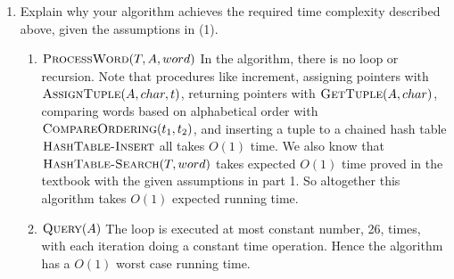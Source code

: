 \documentclass[11pt]{article}
\begin{document}
\begin{enumerate}
\begin{algorithm}[H]
  \end{algorithm}

  \begin{algorithm}[H]
    \caption{$ $}
  \end{algorithm}
  \item Explain why your algorithm achieves the required time complexity described above, given the assumptions in (1).

  \begin{enumerate}
    \item $\textsc{ProcessWord}(T, A, word)$ In the algorithm, there is no loop or recursion. Note that procedures like increment, assigning pointers with $\textsc{AssignTuple}(A, char, t)$, returning pointers with $\textsc{GetTuple}(A, char)$, comparing words based on alphabetical order with $\textsc{CompareOrdering}(t_1, t_2)$, and inserting a tuple to a chained hash table $\textsc{HashTable-Insert}$ all takes $O(1)$ time. We also know that $\textsc{HashTable-Search}(T, word)$ takes expected $O(1)$ time proved in the textbook with the given assumptions in part 1. So altogether this algorithm takes $O(1)$ expected running time.
    \item $\textsc{Query}(A)$ The loop is executed at most constant number, 26, times, with each iteration doing a constant time operation. Hence the algorithm has a $O(1)$ worst case running time.
  \end{enumerate}
\end{enumerate}
\end{document}
